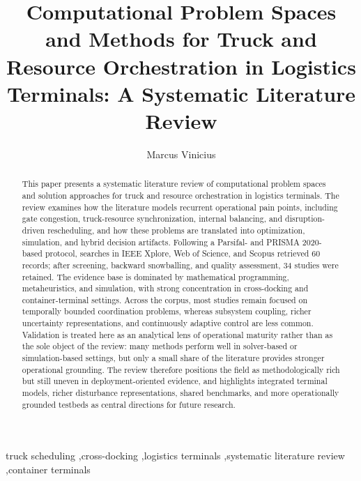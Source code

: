 \documentclass[preprint,12pt,number,longtitle]{elsarticle}
\begin{document}
\begin{frontmatter}
\title{Computational Problem Spaces and Methods for Truck and Resource Orchestration in Logistics Terminals: A Systematic Literature Review}

\author[aff1]{Marcus Vinicius}



\begin{abstract}
This paper presents a systematic literature review of computational problem spaces and solution approaches for truck and resource orchestration in logistics terminals. The review examines how the literature models recurrent operational pain points, including gate congestion, truck-resource synchronization, internal balancing, and disruption-driven rescheduling, and how these problems are translated into optimization, simulation, and hybrid decision artifacts. Following a Parsifal- and PRISMA 2020-based protocol, searches in IEEE Xplore, Web of Science, and Scopus retrieved 60 records; after screening, backward snowballing, and quality assessment, 34 studies were retained. The evidence base is dominated by mathematical programming, metaheuristics, and simulation, with strong concentration in cross-docking and container-terminal settings. Across the corpus, most studies remain focused on temporally bounded coordination problems, whereas subsystem coupling, richer uncertainty representations, and continuously adaptive control are less common. Validation is treated here as an analytical lens of operational maturity rather than as the sole object of the review: many methods perform well in solver-based or simulation-based settings, but only a small share of the literature provides stronger operational grounding. The review therefore positions the field as methodologically rich but still uneven in deployment-oriented evidence, and highlights integrated terminal models, richer disturbance representations, shared benchmarks, and more operationally grounded testbeds as central directions for future research.
\end{abstract}

\begin{keyword}
truck scheduling \sep cross-docking \sep logistics terminals \sep systematic literature review \sep container terminals
\end{keyword}
\end{frontmatter}
\end{document}
